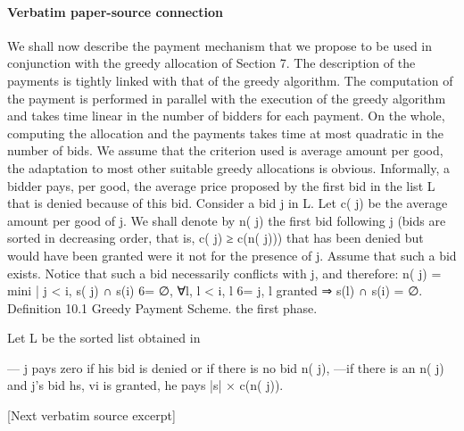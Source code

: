 \documentclass[10pt]{article}
\begin{document}
\paragraph{Verbatim paper-source connection}
\begin{ReviewVerbatim}
We shall now describe the payment mechanism that we propose to be used in
conjunction with the greedy allocation of Section 7. The description of the payments
is tightly linked with that of the greedy algorithm. The computation of the payment
is performed in parallel with the execution of the greedy algorithm and takes time
linear in the number of bidders for each payment. On the whole, computing the
allocation and the payments takes time at most quadratic in the number of bids.
We assume that the criterion used is average amount per good, the adaptation
to most other suitable greedy allocations is obvious. Informally, a bidder pays, per
good, the average price proposed by the first bid in the list L that is denied because
of this bid. Consider a bid j in L. Let c( j) be the average amount per good of j. We
shall denote by n( j) the first bid following j (bids are sorted in decreasing order,
that is, c( j) ≥ c(n( j))) that has been denied but would have been granted were it
not for the presence of j. Assume that such a bid exists. Notice that such a bid
necessarily conflicts with j, and therefore:
n( j) = min{i | j < i, s( j) ∩ s(i) 6= ∅, ∀l, l < i, l 6= j, l granted ⇒ s(l) ∩ s(i) = ∅}.
Definition 10.1 Greedy Payment Scheme.
the first phase.

Let L be the sorted list obtained in

— j pays zero if his bid is denied or if there is no bid n( j),
—if there is an n( j) and j’s bid hs, vi is granted, he pays |s| × c(n( j)).

[Next verbatim source excerpt]


\end{ReviewVerbatim}
\end{document}
